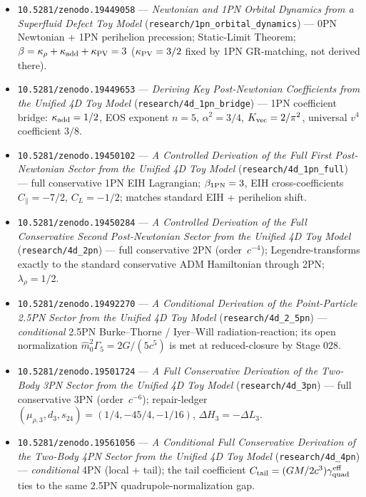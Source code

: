 \begin{itemize}\setlength\itemsep{0.15em}
\item \texttt{10.5281/zenodo.19449058} --- \emph{Newtonian and 1PN Orbital Dynamics from a Superfluid Defect Toy Model}
  (\nolinkurl{research/1pn_orbital_dynamics}) --- 0PN Newtonian + 1PN perihelion precession; Static-Limit Theorem;
  \(\beta=\kappa_\rho+\kappa_{\rm add}+\kappa_{\rm PV}=3\) (\(\kappa_{\rm PV}=3/2\) fixed by 1PN GR-matching, not
  derived there).
\item \texttt{10.5281/zenodo.19449653} --- \emph{Deriving Key Post-Newtonian Coefficients from the Unified 4D Toy
  Model} (\nolinkurl{research/4d_1pn_bridge}) --- 1PN coefficient bridge: \(\kappa_{\rm add}=1/2\), EOS exponent
  \(n=5\), \(\alpha^2=3/4\), \(K_{\rm vec}=2/\pi^2\), universal \(v^4\) coefficient \(3/8\).
\item \texttt{10.5281/zenodo.19450102} --- \emph{A Controlled Derivation of the Full First Post-Newtonian Sector from
  the Unified 4D Toy Model} (\nolinkurl{research/4d_1pn_full}) --- full conservative 1PN EIH Lagrangian;
  \(\beta_{\rm 1PN}=3\), EIH cross-coefficients \(C_\parallel=-7/2\), \(C_L=-1/2\); matches standard EIH + perihelion
  shift.
\item \texttt{10.5281/zenodo.19450284} --- \emph{A Controlled Derivation of the Full Conservative Second
  Post-Newtonian Sector from the Unified 4D Toy Model} (\nolinkurl{research/4d_2pn}) --- full conservative 2PN
  (order~\(c^{-4}\)); Legendre-transforms exactly to the standard conservative ADM Hamiltonian through 2PN;
  \(\lambda_\rho=1/2\).
\item \texttt{10.5281/zenodo.19492270} --- \emph{A Conditional Derivation of the Point-Particle 2.5PN Sector from the
  Unified 4D Toy Model} (\nolinkurl{research/4d_2_5pn}) --- \emph{conditional} 2.5PN Burke--Thorne / Iyer--Will
  radiation-reaction; its open normalization \(\hat m_0^2\Gamma_5=2G/(5c^5)\) is met at reduced-closure by Stage 028.
\item \texttt{10.5281/zenodo.19501724} --- \emph{A Full Conservative Derivation of the Two-Body 3PN Sector from the
  Unified 4D Toy Model} (\nolinkurl{research/4d_3pn}) --- full conservative 3PN (order~\(c^{-6}\)); repair-ledger
  \((\mu_{\rho,3},d_3,s_{24})=(1/4,-45/4,-1/16)\), \(\Delta H_3=-\Delta L_3\).
\item \texttt{10.5281/zenodo.19561056} --- \emph{A Conditional Full Conservative Derivation of the Two-Body 4PN Sector
  from the Unified 4D Toy Model} (\nolinkurl{research/4d_4pn}) --- \emph{conditional} 4PN (local + tail); the tail
  coefficient \(C_{\rm tail}=(GM/2c^3)\gamma_{\rm quad}^{\rm eff}\) ties to the same 2.5PN quadrupole-normalization
  gap.
\end{itemize}

